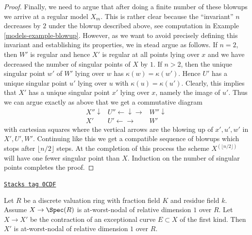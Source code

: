 \begin{proof}
\medskip\noindent
Finally, we need to argue that after doing a finite number
of these blowups we arrive at a regular model $X_m$.
This is rather clear because the ``invariant'' $n$ decreases by $2$
under the blowup described above, see computation in
Example \ref{models-example-blowup}.
However, as we want to avoid precisely defining this invariant
and establishing its properties, we in stead argue as follows.
If $n = 2$, then $W'$ is regular and hence $X'$
is regular at all points lying over $x$ and we have
decreased the number of singular points of $X$ by $1$.
If $n > 2$, then the unique singular point $w'$ of $W'$ lying over $w$
has $\kappa(w) = \kappa(w')$. Hence $U'$ has a unique
singular point $u'$ lying over $u$ with $\kappa(u) = \kappa(u')$.
Clearly, this implies that $X'$ has a unique singular point $x'$
lying over $x$, namely the image of $u'$. Thus we can
argue exactly as above that we get a commutative diagram
$$
\begin{array}{ccc}X'' \downarrow & U'' \longleftarrow\downarrow\longrightarrow & W'' \downarrow \\ X' & U' \longleftarrow\longrightarrow & W'\end{array}
$$
with cartesian squares where the vertical arrows are the blowing
up of $x', u', w'$ in $X', U', W'$. Continuing like this we get
a compatible sequence of blowups which stops after
$\lfloor n/2 \rfloor$ steps. At the completion of this process
the scheme $X^{(\lfloor n/2 \rfloor)}$ will have one fewer
singular point than $X$. Induction on the number of singular
points completes the proof.
\end{proof}

\begin{lemma}
\label{models-lemma-blowdown-at-worst-nodal}
\href{https://stacks.math.columbia.edu/tag/0CDF}{\texttt{Stacks tag 0CDF}}

Let $R$ be a discrete valuation ring with fraction field $K$
and residue field $k$. Assume $X \to \Spec(R)$ is
at-worst-nodal of relative dimension $1$ over $R$.
Let $X \to X'$ be the contraction of an
exceptional curve $E \subset X$ of the first kind.
Then $X'$ is at-worst-nodal of relative dimension $1$ over $R$.
\end{lemma}

